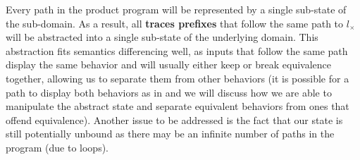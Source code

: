 
Every path in the product program will be represented by a single sub-state of the sub-domain. As a result, all \textbf{traces prefixes} that follow the same path to $l_{\times}$ will be abstracted into a single sub-state of the underlying domain. This abstraction fits semantics differencing well, as inputs that follow the same path display the same behavior and will usually either keep or break equivalence together, allowing us to separate them from other behaviors (it is possible for a path to display both behaviors as in  and we will discuss how we are able to manipulate the abstract state and separate equivalent behaviors from ones that offend equivalence). Another issue to be addressed is the fact that our state is still potentially unbound as there may be an infinite number of paths in the program (due to loops).


